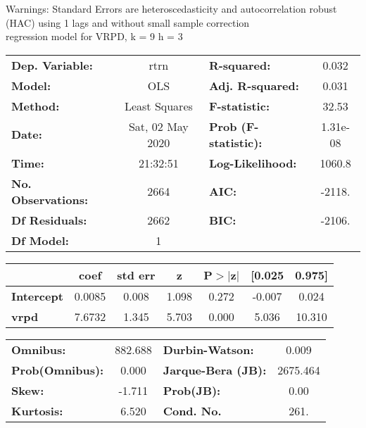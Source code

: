 Warnings: \newline
 [1] Standard Errors are heteroscedasticity and autocorrelation robust (HAC) using 1 lags and without small sample correction\\ 

regression model for VRPD, k = 9 h = 3\begin{center}
\begin{tabular}{lclc}
\toprule
\textbf{Dep. Variable:}    &       rtrn       & \textbf{  R-squared:         } &     0.032   \\
\textbf{Model:}            &       OLS        & \textbf{  Adj. R-squared:    } &     0.031   \\
\textbf{Method:}           &  Least Squares   & \textbf{  F-statistic:       } &     32.53   \\
\textbf{Date:}             & Sat, 02 May 2020 & \textbf{  Prob (F-statistic):} &  1.31e-08   \\
\textbf{Time:}             &     21:32:51     & \textbf{  Log-Likelihood:    } &    1060.8   \\
\textbf{No. Observations:} &        2664      & \textbf{  AIC:               } &    -2118.   \\
\textbf{Df Residuals:}     &        2662      & \textbf{  BIC:               } &    -2106.   \\
\textbf{Df Model:}         &           1      & \textbf{                     } &             \\
\bottomrule
\end{tabular}
\begin{tabular}{lcccccc}
                   & \textbf{coef} & \textbf{std err} & \textbf{z} & \textbf{P$> |$z$|$} & \textbf{[0.025} & \textbf{0.975]}  \\
\midrule
\textbf{Intercept} &       0.0085  &        0.008     &     1.098  &         0.272        &       -0.007    &        0.024     \\
\textbf{vrpd}      &       7.6732  &        1.345     &     5.703  &         0.000        &        5.036    &       10.310     \\
\bottomrule
\end{tabular}
\begin{tabular}{lclc}
\textbf{Omnibus:}       & 882.688 & \textbf{  Durbin-Watson:     } &    0.009  \\
\textbf{Prob(Omnibus):} &   0.000 & \textbf{  Jarque-Bera (JB):  } & 2675.464  \\
\textbf{Skew:}          &  -1.711 & \textbf{  Prob(JB):          } &     0.00  \\
\textbf{Kurtosis:}      &   6.520 & \textbf{  Cond. No.          } &     261.  \\
\bottomrule
\end{tabular}
\end{center}

